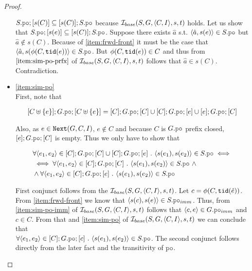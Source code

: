 \documentclass[12pt]{article}
\begin{document}
\begin{proof}
\begin{itemize}
    $S.\lPO;[s(C)] \subseteq [s(C)];S.\lPO$ because $\mathcal{I}_{base}(S, G, \langle C, I \rangle, s, t)$ holds.
    Let us show that $S.\lPO;[s(e)] \subseteq [s(C)];S.\lPO$.
    Suppose there exists $\hat{a}$ s.t. $\tup{\hat{a}, s(e)} \in S.\lPO$ but
    $\hat{a} \not\in s(C)$.
    Because of \ref{item:frwd-front}
    it must be the case that $\tup{\hat{a}, s(\front(C, \lTID(e))} \in S.\lPO$.
    But $\phi(C, {\mathtt{tid}}(e)) \in C$ and thus from $\ref{item:sim-po-prfx}$
    of $\mathcal{I}_{base}(S, G, \langle C, I \rangle, s, t)$ follows that $\hat{a} \in s(C)$. Contradiction.

  \item \ref{item:sim-po} \\
    First, note that 
    
    \begin{equation*}
      \begin{split}
        [C \uplus \{e\}];G.\lPO;[C \uplus \{e\}] =
          [C];G.\lPO;[C] \cup [C];G.\lPO;[e] \cup [e];G.\lPO;[C]
      \end{split}
    \end{equation*}

    Also, as $e \in {\mathtt{Next}}(G, C, I)$, $e \not\in C$ and
    because $C$ is $G.\lPO$ prefix closed, $[e];G.\lPO;[C]$ is empty.
    Thus we only have to show that

    \begin{equation*}
      \begin{split}
        & \forall{\tup{e_1, e_2} \in [C];G.\lPO;[C] \cup [C];G.\lPO;[e]} ~.~
            \tup{s(e_1), s(e_2)} \in S.\lPO \iff \\
        & \iff
          \forall{\tup{e_1, e_2} \in [C];G.\lPO;[C]} ~.~ \tup{s(e_1), s(e_2)} \in S.\lPO ~ \wedge \\
        & \wedge
          \forall{\tup{e_1, e_2} \in [C];G.\lPO;[e]} ~.~ \tup{s(e_1), s(e_2)} \in S.\lPO
      \end{split}
    \end{equation*}

    First conjunct follows from the $\mathcal{I}_{base}(S, G, \langle C, I \rangle, s, t)$.
    Let $c = \phi(C, {\mathtt{tid}}(\hat{e}))$. 
    From \ref{item:frwd-front} we know that $\tup{s(c), s(e)} \in S.\lPO_{imm}$.
    Thus, from \ref{item:sim-po-imm} of $\mathcal{I}_{base}(S, G, \langle C, I \rangle, s, t)$
    follows that $\tup{c, e} \in G.\lPO_{imm}$ and $c \in C$.
    From that and \ref{item:sim-po} of $\mathcal{I}_{base}(S, G, \langle C, I \rangle, s, t)$
    we can conclude that \\
    $\forall{\tup{e_1, e_2} \in [C];G.\lPO;[c]} ~.~ \tup{s(e_1), s(e_2)} \in S.\lPO$.
    The second conjunct follows directly from the later fact and the transitivity of $\lPO$.


\end{itemize}
\end{proof}
\end{document}
